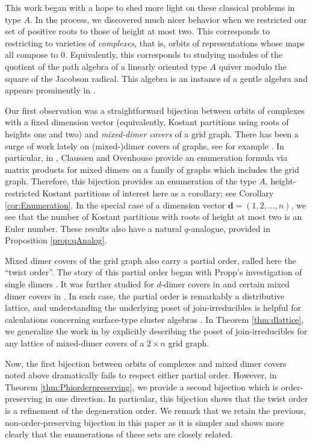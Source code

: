 \documentclass{amsart}
\theoremstyle{definition}
\begin{document}
This work began with a hope to shed more light on these classical problems in type $A$. In the process, we discovered much nicer behavior when we restricted our set of positive roots to those of height at most two. This corresponds to restricting to varieties of \emph{complexes}, that is, orbits of representations whose maps all compose to 0. Equivalently, this corresponds to studying modules of the quotient of the path algebra of a linearly oriented type $A$ quiver modulo the square of the Jacobson radical. This algebra is an instance of a gentle algebra and appears prominently in \cite{Schemes}.  

Our first observation was a straightforward bijection between orbits of complexes with a fixed dimension vector (equivalently, Kostant partitions using roots of heights one and two) and \emph{mixed-dimer covers} of a grid graph. There has been a surge of work lately on (mixed-)dimer covers of graphs, see for example \cite{ClaussenOvenhouse,zbMATH08171225,zbMATH08171225,zbMATH07567672}. In particular, in \cite{ClaussenOvenhouse}, Claussen and Ovenhouse provide an enumeration formula via matrix products for mixed dimers on a family of graphs which includes the grid graph. Therefore, this bijection provides an enumeration of the type $A$, height-restricted Kostant partitions of interest here as a corollary; see Corollary \ref{cor:Enumeration}. In the special case of a dimension vector $\mathbf{d} = (1,2,\ldots, n)$, we see that the number of Kostant partitions with roots of height at most two is an Euler number. These results also have a natural $q$-analogue, provided in Proposition \ref{prop:qAnalog}.


Mixed dimer covers of the grid graph also carry a partial order, called here the ``twist order''. The story of this partial order began with Propp's investigation of single dimers \cite{propp2002lattice}. It was further studied for $d$-dimer covers in \cite{zbMATH08171225} and certain mixed dimer covers in \cite{claussen2020expansion}. In each case, the partial order is remarkably a distributive lattice, and understanding the underlying poset of join-irreducibles is helpful for calculations concerning surface-type cluster algebras \cite{musiker2013bases}. In Theorem \ref{thm:dlattice}, we generalize the work in \cite{claussen2020expansion} by explicitly describing the poset of join-irreducibles for any lattice of mixed-dimer covers of a $2 \times n$ grid graph. 

Now, the first bijection between orbits of complexes and mixed dimer covers noted above dramatically fails to respect either partial order. However, in Theorem \ref{thm:Phiorderpreserving}, we provide a second bijection which is order-preserving in one direction. In particular, this bijection shows that the twist order is a refinement of the degeneration order. We remark that we retain the previous, non-order-preserving bijection in this paper as it is simpler and shows more clearly that the enumerations of these sets are closely related.  
\end{document}
